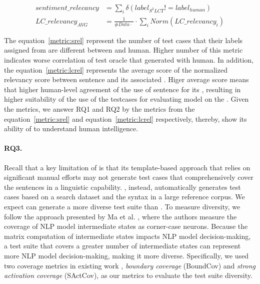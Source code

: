 \begin{eqnarray}
  sentiment\_relecancy &= \sum_{i} \delta(label_{S^2LCT}!=label_{human}) \label{metric:srel} \\
  LC\_relevancy_{AVG} &= \frac{1}{\#Data\cdot~}\cdot\sum_{i} Norm(LC\_relevancy_i) \label{metric:lcrel}
\end{eqnarray}

The equation~\ref{metric:srel} represent the number of test cases that
their labels assigned from are different between \tool and
human. Higher number of this metric indicates worse correlation of
test oracle that \tool generated with human. In addition, the
equation~\ref{metric:lcrel} represents the average score of the
normalized relevancy score between sentence and its associated
\lc. Higer average score means that higher human-level agreement of
the use of sentence for its \lc, resulting in higher suitability of
the use of the testcases for evaluating model on the \lc. Given the
metrics, we answer RQ1 and RQ2 by the metrics from the
equation~\ref{metric:srel} and equation~\ref{metric:lcrel}
respectively, thereby, show its ability of \tool to understand human
intelligence.

\paragraph{RQ3.}
Recall that a key limitation of \Cklst is that its template-based
approach that relies on significant manual efforts may not generate
test cases that comprehensively cover the sentences in a linguistic
capability. \tool, instead, automatically generates test cases based
on a search dataset and the syntax in a large reference corpus. We
expect \tool can generate a more diverse test suite than \Cklst. To
measure diversity, we follow the approach presented by Ma et
al. \cite{ma2018deepgauge}, where the authors measure the coverage of
NLP model intermediate states as corner-case neurons.  Because the
matrix computation of intermediate states impacts NLP model
decision-making, a test suite that covers a greater number of
intermediate states can represent more NLP model decision-making,
making it more diverse.  Specifically, we used two coverage metrics in
existing work \cite{ma2018deepgauge}, \textit{boundary coverage}
(BoundCov) and \textit{strong activation coverage} (SActCov), as our
metrics to evaluate the test suite diversity.  



